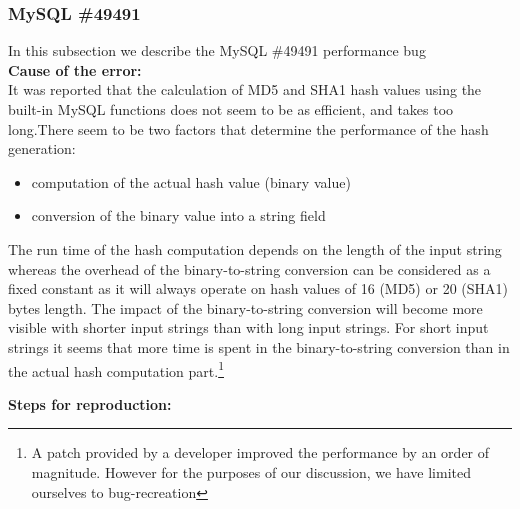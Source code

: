 \subsubsection{MySQL \#49491}

In this subsection we describe the MySQL \#49491 performance bug \\

\noindent \textbf{Cause of the error:} \\

It was reported that the calculation of MD5 and SHA1 hash values using the built-in MySQL functions does not seem to be as efficient, and takes too long.There seem to be two factors that determine the performance of the hash generation:
\begin{itemize}
	\item computation of the actual hash value (binary value)
	\item conversion of the binary value into a string field
\end{itemize}

The run time of the hash computation depends on the length of the input string whereas the overhead of the binary-to-string conversion can be considered as a fixed constant as it will always operate on hash values of 16 (MD5) or 20 (SHA1) bytes length.
The impact of the binary-to-string conversion will become more visible with shorter input strings than with long input strings. For short input strings it seems that more time is spent in the binary-to-string conversion than in the actual hash computation part.\footnote{A patch provided by a developer improved the performance by an order of magnitude. However for the purposes of our discussion, we have limited ourselves to bug-recreation}

\noindent \textbf{Steps for reproduction:} \\

